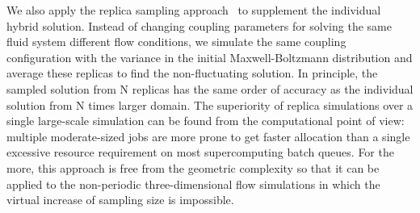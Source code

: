 \documentclass[preprint,12pt]{elsarticle}
\begin{document}
We also apply the replica sampling approach~\cite{REMD} to supplement the individual hybrid solution. Instead of changing coupling parameters for solving the same fluid system different flow conditions, we simulate the same coupling configuration with the variance in the initial Maxwell-Boltzmann distribution and average these replicas to find the non-fluctuating solution. In principle, the sampled solution from N replicas has the same order of accuracy as the individual solution from N times larger domain. The superiority of replica simulations over a single large-scale simulation can be found from the computational point of view: multiple moderate-sized jobs are more prone to get faster allocation than a single excessive resource requirement on most supercomputing batch queues. For the more, this approach is free from the geometric complexity so that it can be applied to the non-periodic three-dimensional flow simulations in which the virtual increase of sampling size is impossible.



\end{document}
